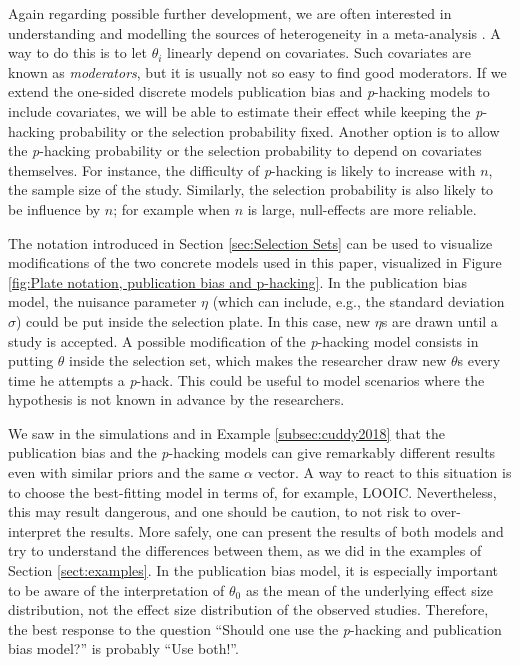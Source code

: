 \documentclass[preprint, authoryear]{elsarticle}
\theoremstyle{plain}
\theoremstyle{definition}
\begin{document}
Again regarding possible further development, we are often interested in understanding and modelling the sources of heterogeneity in a meta-analysis \citep{thompson1994systematic}. A way to do this is to let $\theta_{i}$ linearly depend on covariates. Such covariates are known as \emph{moderators}, but it is usually not so easy to find good moderators. If we extend the one-sided discrete models publication bias and \emph{p}-hacking models to include covariates, we will be able to estimate their effect while keeping the \emph{p}-hacking probability or the selection probability fixed. Another option is to allow the \emph{p}-hacking probability or the selection probability to depend on covariates themselves. For instance, the difficulty of \emph{p}-hacking is likely to increase with $n$, the sample size of the study. Similarly, the selection probability is also likely to be influence by $n$; for example when $n$ is large, null-effects are more reliable.

The notation introduced in Section \ref{sec:Selection Sets} can be used to visualize modifications of the two concrete models used in this paper, visualized in Figure \ref{fig:Plate notation, publication bias and p-hacking}. In the publication bias model, the nuisance parameter $\eta$ (which can include, e.g., the standard deviation $\sigma$) could be put inside the selection plate. In this case, new $\eta$s are drawn until a study is accepted. A possible modification of the \emph{p}-hacking model consists in putting $\theta$ inside the selection set, which makes the researcher draw new $\theta$s every time he attempts a \emph{p}-hack. This could be useful to model scenarios where the hypothesis is not
known in advance by the researchers.

We saw in the simulations and in Example \ref{subsec:cuddy2018} that the publication bias and the \emph{p}-hacking models can give remarkably different results even with similar priors and the same $\alpha$ vector. A way to react to this situation is to choose the best-fitting model in terms of, for example, LOOIC. Nevertheless, this may result dangerous, and one should be caution, to not risk to over-interpret the results. More safely, one can present the results of both models and try to understand the differences between them, as we did in the examples of Section \ref{sect:examples}. In the publication bias model, it is especially important to be aware of the interpretation of $\theta_{0}$ as the mean of the underlying effect size distribution, not the effect size distribution of the observed studies. Therefore, the best response to the question ``Should one use the \emph{p}-hacking and publication bias model?'' is probably ``Use both!''.
\end{document}

